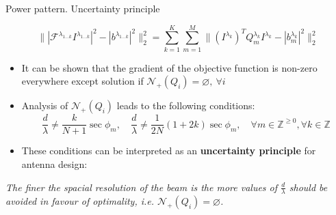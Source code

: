 \documentclass[../main.tex]{subfiles}
\begin{document}
\begin{frame}[t]{Power pattern. Uncertainty principle}

\begin{equation*}
\Big\| |\mathcal{F}^{\lambda_{1 \ldots k}} I^{\lambda_{1\ldots k}}|^2 - |b^{\lambda_{1 \ldots k}}|^2 \Big\|_2^2 = \sum_{k=1}^K \sum_{m=1}^M \Big\| (I^{\lambda_{k}})^T Q^{\lambda_{k}}_m  I^{\lambda_{k}} - |b^{\lambda_{k}}_m|^2 \Big\|_2^2
\end{equation*}


 
\begin{itemize}
	\item It can be shown that the gradient of the objective function is non-zero everywhere except solution if $\mathcal{N}_{+}(Q_i) = \varnothing, ~\forall i$
	\item Analysis of $\mathcal{N}_{+}(Q_i)$ leads to the following conditions:
	\begin{equation*}
  \frac{d}{\lambda} \neq \frac{k}{N+1} \sec \phi_m , \quad \frac{d}{\lambda} \neq \frac{1}{2N} (1 + 2k) \sec \phi_m, \quad \forall m \in \mathbb{Z}^{\ge 0}, \forall k \in \mathbb{Z}
  \label{antenna_design_condition}
	\end{equation*}
	\item These conditions can be interpreted as an \textbf{uncertainty principle} for antenna design: 
\end{itemize}

\begin{center}
\begin{tcolorbox}
\textit{The finer the spacial resolution of the beam is the more values of $\frac{d}{\lambda}$ should be avoided in favour of optimality, i.e. $\mathcal{N}_{+}(Q_i) = \varnothing$.}
\end{tcolorbox}
\end{center}

\end{frame}
\end{document}
